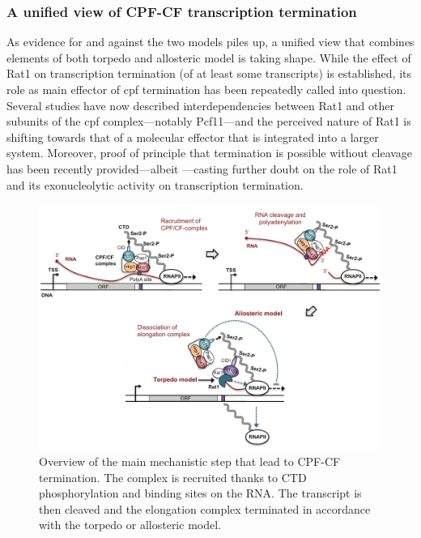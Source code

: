 \subsubsection{A unified view of CPF-CF transcription termination}

As evidence for and against the two models piles up, a unified view that combines elements of both torpedo and allosteric model is taking shape.
While the effect of Rat1 on transcription termination (of at least some transcripts) is established, its role as main effector of \gls{cpf} termination has been repeatedly called into question.
Several studies have now described interdependencies between Rat1 and other subunits of the \gls{cpf} complex---notably Pcf11---and the perceived nature of Rat1 is shifting towards that of a molecular effector  that is integrated into a larger system.
Moreover, proof of principle that termination is possible without cleavage has been recently provided---albeit \invitro{}---casting further doubt on the role of Rat1 and its exonucleolytic activity on transcription termination.

\begin{figure}[ht]

\centering
\includegraphics[width=\textwidth]{figures/introduction/cpf}
\caption[Mechanism of CPF-CF termination]{Overview of the main mechanistic step that lead to CPF-CF termination. The complex is recruited thanks to CTD phosphorylation and binding sites on the RNA. The transcript is then cleaved and the elongation complex terminated in accordance with the torpedo or allosteric model.}
\label{fig:cpfTermination}

\end{figure}

